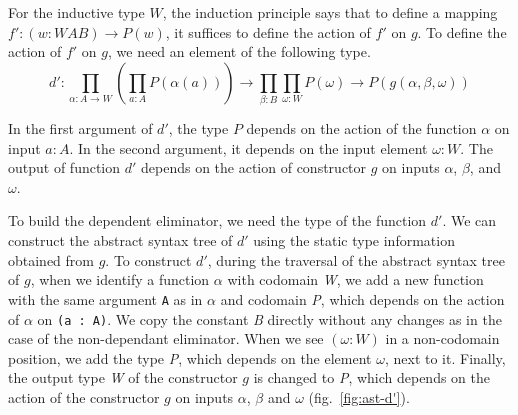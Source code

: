 \documentclass[sigplan,10pt]{acmart}
\begin{document}
For the inductive type $W$, the induction principle says that to define a mapping $f' : (w : W A B) \rightarrow P(w)$, it suffices to define the action of $f'$ on $g$. To define the action of $f'$ on $g$, we need an element of the following type.
\begin{equation}
d' : \prod_{\alpha : A \rightarrow W} (\prod_{a : A} P(\alpha (a))) \rightarrow  \prod_{\beta : B} \prod_{\omega : W} P(\omega) \rightarrow P (g(\alpha, \beta, \omega)) \nonumber
\end{equation}

In the first argument of $d'$, the type $P$ depends on the action of the function $\alpha$ on input $a : A$. In the second argument, it depends on the input element $\omega : W$. The output of function $d'$ depends on the action of constructor $g$ on inputs $\alpha$, $\beta$, and $\omega$.

To build the dependent eliminator, we need the type of the function $d'$. We can construct the abstract syntax tree of $d'$ using the static type information obtained from $g$. To construct $d'$, during the traversal of the abstract syntax tree of $g$, when we identify a function $\alpha$ with codomain \emph{W}, we add a new function with the same argument {\tt A} as in $\alpha$ and codomain \emph{P}, which depends on the action of $\alpha$ on {\tt (a : A)}. We copy the constant \emph{B} directly without any changes as in the case of the non-dependant eliminator. When we see $(\omega : W)$ in a non-codomain position, we add the type \emph{P}, which depends on the element $\omega$, next to it. Finally, the output type \emph{W} of the constructor $g$ is changed to \emph{P}, which depends on the action of the constructor $g$ on inputs $\alpha$, $\beta$ and $\omega$ (fig.~\ref{fig:ast-d'}).

\end{document}
